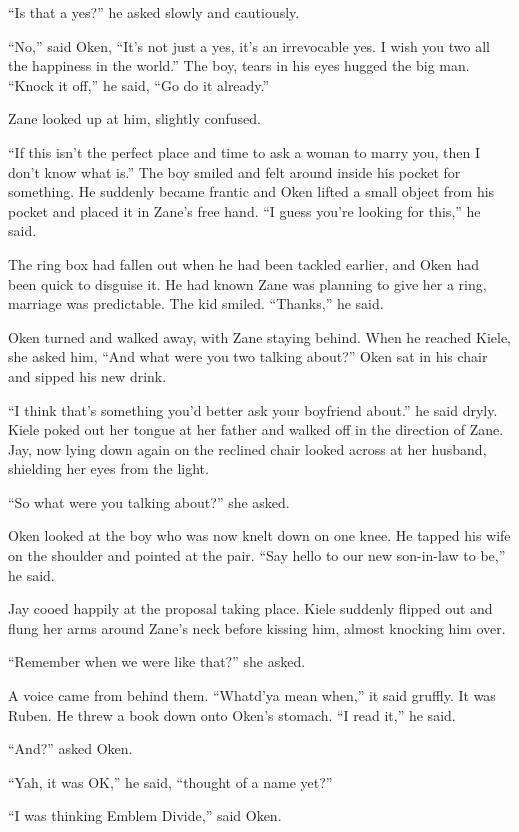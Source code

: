 ``Is that a yes?'' he asked slowly and cautiously.

``No,'' said Oken, ``It's not just a yes, it's an irrevocable yes.  I wish you two all the happiness in the world.''  The boy, tears in his eyes hugged the big man.  ``Knock it off,'' he said, ``Go do it already.''

Zane looked up at him, slightly confused.

``If this isn't the perfect place and time to ask a woman to marry you, then I don't know what is.''  The boy smiled and felt around inside his pocket for something.  He suddenly became frantic and Oken lifted a small object from his pocket and placed it in Zane's free hand.  ``I guess you're looking for this,'' he said.

The ring box had fallen out when he had been tackled earlier, and Oken had been quick to disguise it.  He had known Zane was planning to give her a ring, marriage was predictable.  The kid smiled.  ``Thanks,'' he said.

Oken turned and walked away, with Zane staying behind.  When he reached Kiele, she asked him, ``And what were you two talking about?''  Oken sat in his chair and sipped his new drink.

``I think that's something you'd better ask your boyfriend about.'' he said dryly.  Kiele poked out her tongue at her father and walked off in the direction of Zane.  Jay, now lying down again on the reclined chair looked across at her husband, shielding her eyes from the light.  

``So what were you talking about?'' she asked.

Oken looked at the boy who was now knelt down on one knee.  He tapped his wife on the shoulder and pointed at the pair.  ``Say hello to our new son-in-law to be,'' he said.

Jay cooed happily at the proposal taking place.  Kiele suddenly flipped out and flung her arms around Zane's neck before kissing him, almost knocking him over.

``Remember when we were like that?'' she asked.  

A voice came from behind them.  ``Whatd'ya mean when,'' it said gruffly.  It was Ruben.  He threw a book down onto Oken's stomach.  ``I read it,'' he said.

``And?'' asked Oken.

``Yah, it was OK,'' he said, ``thought of a name yet?''

``I was thinking Emblem Divide,'' said Oken.

